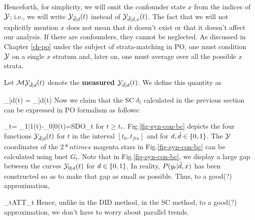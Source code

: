 Henceforth, 
for simplicity, we will
omit the confounder state $x$
from the indices of ${\cal Y}$; i.e., we will write
${\cal Y}_{{\tilde{d}}|d}(t)$
instead of ${\cal Y}_{{\tilde{d}}|d, x}(t)$.
The fact that we will
not explicitly
mention $x$ does not
mean that it doesn't exist
or that it doesn't affect our analysis.
If there are confounders,
they cannot be neglected.
As discussed in Chapter \ref{ch-po}
under the subject of strata-matching in PO,
one must condition ${\cal Y}$
on a single $x$ stratum
and, later on,  one must average
over all the possible $x$ strata.


Let ${\cal M}{\cal Y}_{{\tilde{d}}|d}(t)$ denote the
{\bf measured ${\cal Y}_{{\tilde{d}}|d}(t)$}.
We define this quantity as

\beq
\calm\caly_{\td|d}(t)
=
\caly_{\td|d}(t)
\left[ \indi(\td=0, t< t_*)+
\indi(\td=d, t\geq t_*)\right]
\eeq
Now we claim that the SC 
$\delta_t$ calculated in the 
previous section 
can be expressed in PO formalism as follows:

\beqa
\delta_t=
\caly_{1|1}(t)-\caly_{0|0}(t)=SDO_t
\;
\eeqa
for $t\geq t_*$.
Fig.\ref{fig-syn-con-bc}
depicts the
four functions
${\cal Y}_{{\tilde{d}}|d}(t)$
for $t$ in the interval  $[t_0, t_{fin}]$
and for $d,{\tilde{d}}\in \{0,1\}$.
The ${\cal Y}$ coordinates
of the $2*ntimes$ magenta stars in 
Fig.\ref{fig-syn-con-bc} can 
be calculated using bnet $G_t$.
Note that in Fig.\ref{fig-syn-con-bc},
we display a large gap
between the curves ${\cal Y}_{0|d}(t)$
for $d\in \{0,1\}$.
In reality, $P(y_t|{\tilde{d}},x)$ has been
constructed so as to make that
gap as small as possible.
Thus, to a good(?) approximation,

\beq
\delta_t\approx ATT_t
\eeq
Hence, unlike in the DID method,
in the SC method, to a good(?)
approximation, we don't have to worry
about parallel trends.